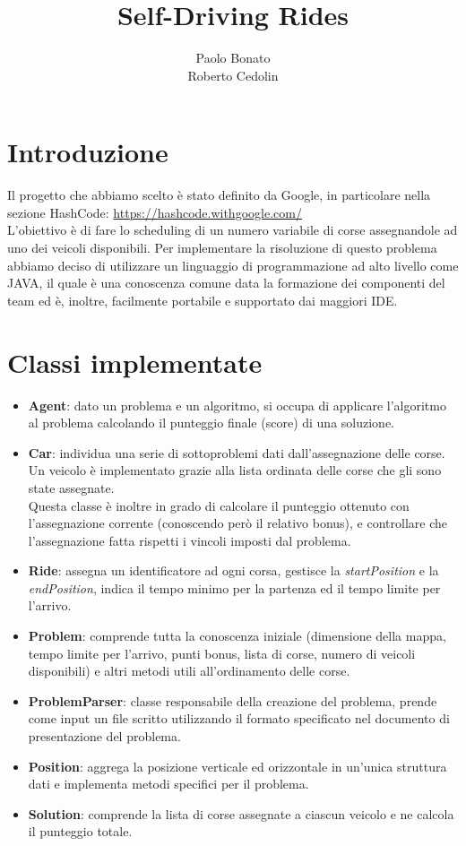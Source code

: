 \documentclass[11pt,a4paper]{article}
\begin{document}
\title{Self-Driving Rides}
\author[1]{Paolo Bonato\\Roberto Cedolin}
\maketitle
\section{Introduzione}
Il progetto che abbiamo scelto è stato definito da Google, in particolare nella sezione HashCode: \url{https://hashcode.withgoogle.com/}\\
L’obiettivo è di fare lo scheduling di un numero variabile di corse assegnandole ad uno dei veicoli disponibili.
Per implementare la risoluzione di questo problema abbiamo deciso di utilizzare un linguaggio di programmazione ad alto livello come JAVA, il quale è una conoscenza comune data la formazione dei componenti del team ed è, inoltre, facilmente portabile e supportato dai maggiori IDE.
\section{Classi implementate}
\begin{itemize}
	\item \textbf{Agent}: dato un problema e un algoritmo, si occupa di applicare l’algoritmo al problema calcolando il punteggio finale (score) di una soluzione.
	\item \textbf{Car}: individua una serie di sottoproblemi dati dall'assegnazione delle corse. Un veicolo è implementato grazie alla lista ordinata delle corse che gli sono state assegnate. \\
	Questa classe è inoltre in grado di calcolare il punteggio ottenuto con l'assegnazione corrente (conoscendo però il relativo bonus), e controllare che l'assegnazione fatta rispetti i vincoli imposti dal problema.
	\item \textbf{Ride}: assegna un identificatore ad ogni corsa, gestisce la \textit{startPosition} e la \textit{endPosition}, indica il tempo minimo per la partenza ed il tempo limite per l'arrivo.
	\item \textbf{Problem}: comprende tutta la conoscenza iniziale (dimensione della mappa, tempo limite per l'arrivo, punti bonus, lista di corse, numero di veicoli disponibili) e altri metodi utili all’ordinamento delle corse.
	\item \textbf{ProblemParser}: classe responsabile della creazione del problema, prende come input un file scritto utilizzando il formato specificato nel documento di presentazione del problema.
	\item \textbf{Position}: aggrega la posizione verticale ed orizzontale in un'unica struttura dati e implementa metodi specifici per il problema.
	\item \textbf{Solution}: comprende la lista di corse assegnate a ciascun veicolo e ne calcola il punteggio totale.
\end{itemize}
\end{document}
